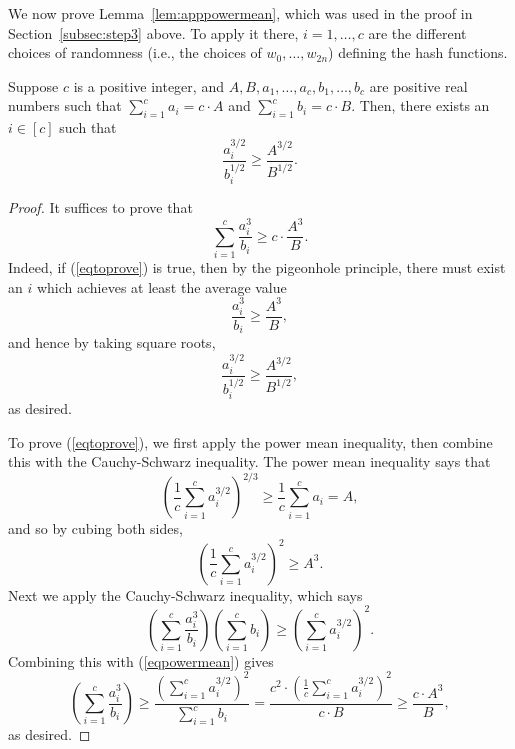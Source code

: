 \documentclass{theoretics}
\begin{document}
We now prove Lemma~\ref{lem:apppowermean}, which was used in the proof in Section~\ref{subsec:step3} above. To apply it there, $i = 1, \ldots, c$ are the different choices of randomness (i.e., the choices of $w_0, \ldots, w_{2n}$) defining the hash functions.

\begin{lemma} \label{lem:apppowermean}
Suppose $c$ is a positive integer, and $A,B,a_1, \ldots, a_c, b_1, \ldots, b_c$ are positive real numbers such that $\sum_{i=1}^c a_i = c \cdot A$ and $\sum_{i=1}^c b_i = c \cdot B$. Then, there exists an $i \in [c]$ such that $$\frac{a_i^{3/2}}{b_i^{1/2}} \geq \frac{A^{3/2}}{B^{1/2}}.$$
\end{lemma}

\begin{proof}
It suffices to prove that \begin{equation}\label{eqtoprove}\sum_{i=1}^c \frac{a_i^3}{b_i} \geq c \cdot \frac{A^3}{B}.\end{equation} Indeed, if (\ref{eqtoprove}) is true, then by the pigeonhole principle, there must exist an $i$ which achieves at least the average value $$\frac{a_i^3}{b_i} \geq \frac{A^3}{B},$$ and hence by taking square roots, $$\frac{a_i^{3/2}}{b_i^{1/2}} \geq \frac{A^{3/2}}{B^{1/2}},$$ as desired.

To prove (\ref{eqtoprove}), we first apply the power mean inequality, then combine this with the Cauchy-Schwarz inequality. The power mean inequality says that
$$\left( \frac{1}{c} \sum_{i=1}^c a_i^{3/2} \right)^{2/3} \geq \frac{1}{c} \sum_{i=1}^c a_i = A,$$
and so by cubing both sides,
\begin{equation}\label{eqpowermean} \left( \frac{1}{c} \sum_{i=1}^c a_i^{3/2} \right)^{2} \geq  A^3. \end{equation}
Next we apply the Cauchy-Schwarz inequality, which says
$$\left( \sum_{i=1}^c \frac{a_i^3}{b_i} \right) \left( \sum_{i=1}^c b_i \right) \geq \left( \sum_{i=1}^c a_i^{3/2} \right)^2.$$
Combining this with (\ref{eqpowermean}) gives
$$\left( \sum_{i=1}^c \frac{a_i^3}{b_i} \right)  \geq \frac{\left( \sum_{i=1}^c a_i^{3/2} \right)^2}{ \sum_{i=1}^c b_i } = \frac{c^2 \cdot \left( \frac{1}{c}\sum_{i=1}^c  a_i^{3/2} \right)^2}{c \cdot B} \geq \frac{c \cdot A^3}{B},$$ as desired.
\end{proof}
\end{document}
